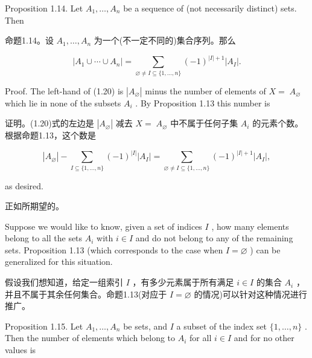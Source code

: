 \documentclass[10pt]{article}
\begin{document}
Proposition 1.14. Let \({A}_{1},\ldots ,{A}_{n}\) be a sequence of (not necessarily distinct) sets. Then

\begin{tcolorbox}\relax
命题1.14。设 \({A}_{1},\ldots ,{A}_{n}\) 为一个(不一定不同的)集合序列。那么
\end{tcolorbox}

\[
\left| {{A}_{1} \cup  \cdots  \cup  {A}_{n}}\right|  = \mathop{\sum }\limits_{{\varnothing  \neq  I \subseteq  \{ 1,\ldots ,n\} }}{\left( -1\right) }^{\left| I\right|  + 1}\left| {A}_{I}\right| . \tag{1.20}
\]

Proof. The left-hand of (1.20) is \(\left| {A}_{\varnothing }\right|\) minus the number of elements of \(X = \; {A}_{\varnothing }\) which lie in none of the subsets \({A}_{i}\) . By Proposition 1.13 this number is

\begin{tcolorbox}\relax
证明。(1.20)式的左边是 \(\left| {A}_{\varnothing }\right|\) 减去 \(X = \; {A}_{\varnothing }\) 中不属于任何子集 \({A}_{i}\) 的元素个数。根据命题1.13，这个数是
\end{tcolorbox}

\[
\left| {A}_{\varnothing }\right|  - \mathop{\sum }\limits_{{I \subseteq  \{ 1,\ldots ,n\} }}{\left( -1\right) }^{\left| I\right| }\left| {A}_{I}\right|  = \mathop{\sum }\limits_{{\varnothing  \neq  I \subseteq  \{ 1,\ldots ,n\} }}{\left( -1\right) }^{\left| I\right|  + 1}\left| {A}_{I}\right| ,
\]

as desired.

\begin{tcolorbox}\relax
正如所期望的。
\end{tcolorbox}

Suppose we would like to know, given a set of indices \(I\) , how many elements belong to all the sets \({A}_{i}\) with \(i \in  I\) and do not belong to any of the remaining sets. Proposition 1.13 (which corresponds to the case when \(I = \varnothing\) ) can be generalized for this situation.

\begin{tcolorbox}\relax
假设我们想知道，给定一组索引 \(I\) ，有多少元素属于所有满足 \(i \in  I\) 的集合 \({A}_{i}\) ，并且不属于其余任何集合。命题1.13(对应于 \(I = \varnothing\) 的情况)可以针对这种情况进行推广。
\end{tcolorbox}

Proposition 1.15. Let \({A}_{1},\ldots ,{A}_{n}\) be sets, and \(I\) a subset of the index set \(\{ 1,\ldots ,n\}\) . Then the number of elements which belong to \({A}_{i}\) for all \(i \in  I\) and for no other values is
\end{document}
